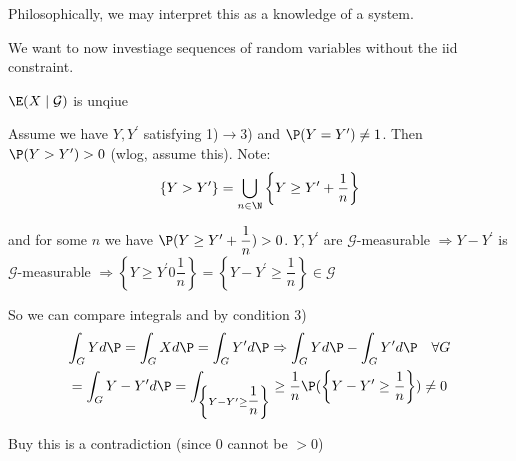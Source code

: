 \noindent Philosophically, we may interpret this as a knowledge of a system.\par
\noindent We want to now investiage sequences of random variables without the iid constraint.
\par\bigskip
\begin{lem}[]{}
  $\E(X\mid\mathcal{G})$ is unqiue
\end{lem}
\par\bigskip
\begin{prf}[]{}
  Assume we have $Y,Y^{\prime}$ satisfying 1)$\to$3) and $\P(Y=Y^{\prime})\neq1$. Then $\P(Y>Y^{\prime})>0$ (wlog, assume this). Note:
  \begin{equation*}
    \begin{gathered}
      \left\{Y>Y^{\prime}\right\} = \bigcup_{n\in\N}\left\{Y\geq Y^{\prime}+\dfrac{1}{n}\right\}
    \end{gathered}
  \end{equation*}\par

  \noindent and for some $n$ we have $\P(Y\geq Y^{\prime}+\dfrac{1}{n})>0$. $Y,Y^{\prime}$ are $\mathcal{G}$-measurable $\Rightarrow Y-Y^{\prime}$ is $\mathcal{G}$-measurable $\Rightarrow \left\{Y\geq Y^{\prime}0\dfrac{1}{n}\right\} = \left\{Y-Y^{\prime}\geq\dfrac{1}{n}\right\}\in\mathcal{G}$ 
  \par\bigskip
  \noindent So we can compare integrals and by condition 3)
  \begin{equation*}
    \begin{gathered}
      \int_G Yd\P = \int_G Xd\P = \int_GY^{\prime}d\P \Rightarrow \int_GYd\P-\int_GY^{\prime}d\P\quad\forall G\\
      = \int_GY-Y^{\prime}d\P = \int_{\left\{Y-Y^{\prime}\geq\dfrac{1}{n}\right\}}\geq\dfrac{1}{n}\P(\left\{Y-Y^{\prime}\geq\dfrac{1}{n}\right\})\neq0
    \end{gathered}
  \end{equation*}\par
  \noindent Buy this is a contradiction (since $0$ cannot be $>0$)
\end{prf}
